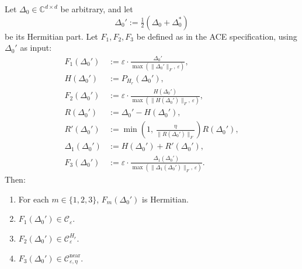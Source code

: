 \documentclass[11pt]{article}
\begin{document}
\begin{proposition}\label{prop:feasibility}
Let \( \Delta_0 \in \mathbb{C}^{d\times d} \) be arbitrary, and let
\[
\Delta_0' := \tfrac12(\Delta_0 + \Delta_0^*)
\]
be its Hermitian part. Let \( F_1, F_2, F_3 \) be defined as in the ACE specification, using \( \Delta_0' \) as input:
\begin{align*}
F_1(\Delta_0') &:= \varepsilon \cdot \frac{\Delta_0'}{\max(\|\Delta_0'\|_F,\,\varepsilon)}, \\
H(\Delta_0') &:= P_{H_r}(\Delta_0'), \\
F_2(\Delta_0') &:= \varepsilon \cdot \frac{H(\Delta_0')}{\max(\|H(\Delta_0')\|_F,\,\varepsilon)}, \\
R(\Delta_0') &:= \Delta_0' - H(\Delta_0'), \\
R'(\Delta_0') &:= \min\!\left(1,\,\frac{\eta}{\|R(\Delta_0')\|_F}\right)R(\Delta_0'), \\
\Delta_1(\Delta_0') &:= H(\Delta_0') + R'(\Delta_0'), \\
F_3(\Delta_0') &:= \varepsilon \cdot \frac{\Delta_1(\Delta_0')}{\max(\|\Delta_1(\Delta_0')\|_F,\,\varepsilon)}.
\end{align*}
Then:
\begin{enumerate}[label=(\alph*), leftmargin=*]
  \item For each \( m\in\{1,2,3\} \), \( F_m(\Delta_0') \) is Hermitian.
  \item \( F_1(\Delta_0') \in \mathcal{C}_\varepsilon \).
  \item \( F_2(\Delta_0') \in \mathcal{C}_\varepsilon^{H_r} \).
  \item \( F_3(\Delta_0') \in \mathcal{C}^{\mathrm{near}}_{\varepsilon,\eta} \).
\end{enumerate}
\end{proposition}
\end{document}
